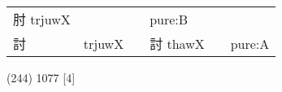 \documentclass[14pt,a4paper]{scrartcl}
\begin{document}
\begin{longtable}[c]{@{}llllll@{}}
\begin{minipage}[t]{0.14\columnwidth}
肘 trjuwX
\strut\end{minipage} &
\begin{minipage}[t]{0.14\columnwidth}\raggedright\strut
\strut\end{minipage} &
\begin{minipage}[t]{0.14\columnwidth}\raggedright\strut
\strut\end{minipage} &
\begin{minipage}[t]{0.14\columnwidth}\raggedright\strut
pure:B
\strut\end{minipage}\tabularnewline
\begin{minipage}[t]{0.14\columnwidth}\raggedright\strut
討
\strut\end{minipage} &
\begin{minipage}[t]{0.14\columnwidth}\raggedright\strut
trjuwX
\strut\end{minipage} &
\begin{minipage}[t]{0.14\columnwidth}\raggedright\strut
\strut\end{minipage} &
\begin{minipage}[t]{0.14\columnwidth}\raggedright\strut
討 thawX
\strut\end{minipage} &
\begin{minipage}[t]{0.14\columnwidth}\raggedright\strut
\strut\end{minipage} &
\begin{minipage}[t]{0.14\columnwidth}\raggedright\strut
pure:A
\strut\end{minipage}\tabularnewline
\bottomrule
\end{longtable}

(244) 1077 {[}4{]}
\end{document}
